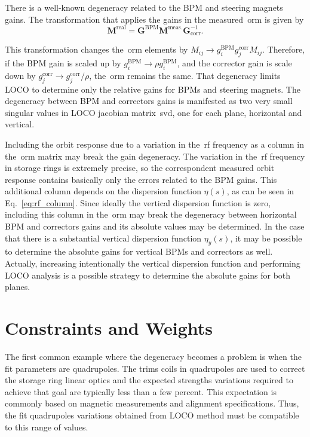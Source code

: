 There is a well-known degeneracy related to the BPM and steering magnets gains. The transformation that applies the gains in the measured~\gls{orm} is given by 
\begin{equation}
    \mathbf{M}^{\mathrm{real}} = \mathbf{G}^{\mathrm{BPM}} \mathbf{M}^{\mathrm{meas.}}\mathbf{G}^{-1}_{\mathrm{corr}}.
\end{equation}

This transformation changes the~\gls{orm} elements by $M_{ij} \rightarrow g_{i}^{\mathrm{BPM}}g_{j}^{\mathrm{corr}}M_{ij}$. Therefore, if the BPM gain is scaled up by $g_{i}^{\mathrm{BPM}} \rightarrow \rho g_{i}^{\mathrm{BPM}}$, and the corrector gain is scale down by $g_{j}^{\mathrm{corr}} \rightarrow g_{j}^{\mathrm{corr}}/\rho$, the~\gls{orm} remains the same. That degeneracy limits LOCO to determine only the relative gains for BPMs and steering magnets. The degeneracy between BPM and correctors gains is manifested as two very small singular values in LOCO jacobian matrix~\gls{svd}, one for each plane, horizontal and vertical.

Including the orbit response due to a variation in the~\gls{rf} frequency as a column in the~\gls{orm} matrix may break the gain degeneracy. The variation in the~\gls{rf} frequency in storage rings is extremely precise, so the correspondent measured orbit response contains basically only the errors related to the BPM gains. This additional column depends on the dispersion function $\eta(s)$, as can be seen in Eq.~\eqref{eq:rf_column}. Since ideally the vertical dispersion function is zero, including this column in the~\gls{orm} may break the degeneracy between horizontal BPM and correctors gains and its absolute values may be determined. In the case that there is a substantial vertical dispersion function $\eta_y(s)$, it may be possible to determine the absolute gains for vertical BPMs and correctors as well. Actually, increasing intentionally the vertical dispersion function and performing LOCO analysis is a possible strategy to determine the absolute gains for both planes.
\section{Constraints and Weights}\label{sec:constraint}
The first common example where the degeneracy becomes a problem is when the fit parameters are quadrupoles. The trims coils in quadrupoles are used to correct the storage ring linear optics and the expected strengths variations required to achieve that goal are typically less than a few percent. This expectation is commonly based on magnetic measurements and alignment specifications. Thus, the fit quadrupoles variations obtained from LOCO method must be compatible to this range of values. 

